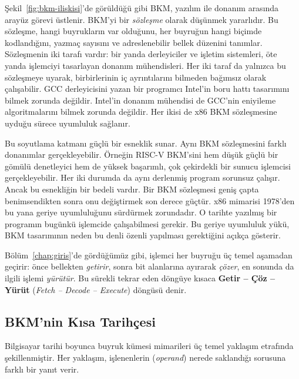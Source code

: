 Şekil~\ref{fig:bkm-iliskisi}'de görüldüğü gibi BKM, yazılım ile donanım arasında arayüz görevi üstlenir. BKM'yi bir \emph{sözleşme} olarak düşünmek yararlıdır. Bu sözleşme, hangi buyrukların var olduğunu, her buyruğun hangi biçimde kodlandığını, yazmaç sayısını ve adreslenebilir bellek düzenini tanımlar. Sözleşmenin iki tarafı vardır: bir yanda derleyiciler ve işletim sistemleri, öte yanda işlemciyi tasarlayan donanım mühendisleri. Her iki taraf da yalnızca bu sözleşmeye uyarak, birbirlerinin iç ayrıntılarını bilmeden bağımsız olarak çalışabilir. GCC derleyicisini yazan bir programcı Intel'in boru hattı tasarımını bilmek zorunda değildir. Intel'in donanım mühendisi de GCC'nin eniyileme algoritmalarını bilmek zorunda değildir. Her ikisi de x86 BKM sözleşmesine uyduğu sürece uyumluluk sağlanır.

Bu soyutlama katmanı güçlü bir esneklik sunar. Aynı BKM sözleşmesini farklı donanımlar gerçekleyebilir. Örneğin RISC-V BKM'sini hem düşük güçlü bir gömülü denetleyici hem de yüksek başarımlı, çok çekirdekli bir sunucu işlemcisi gerçekleyebilir. Her iki durumda da aynı derlenmiş program sorunsuz çalışır. Ancak bu esnekliğin bir bedeli vardır. Bir BKM sözleşmesi geniş çapta benimsendikten sonra onu değiştirmek son derece güçtür. x86 mimarisi 1978'den bu yana geriye uyumluluğunu sürdürmek zorundadır. O tarihte yazılmış bir programın bugünkü işlemcide çalışabilmesi gerekir. Bu geriye uyumluluk yükü, BKM tasarımının neden bu denli özenli yapılması gerektiğini açıkça gösterir.

Bölüm~\ref{chap:giris}'de gördüğümüz gibi, işlemci her buyruğu üç temel aşamadan geçirir: önce bellekten \emph{getirir}, sonra bit alanlarına ayırarak \emph{çözer}, en sonunda da ilgili işlemi \emph{yürütür}. Bu sürekli tekrar eden döngüye kısaca \textbf{Getir -- Çöz -- Yürüt} (\emph{Fetch -- Decode -- Execute}) döngüsü denir.


\subsection{BKM'nin Kısa Tarihçesi}
\label{subsec:bkm-tarihce}

Bilgisayar tarihi boyunca buyruk kümesi mimarileri üç temel yaklaşım etrafında şekillenmiştir. Her yaklaşım, işlenenlerin (\emph{operand}) nerede saklandığı sorusuna farklı bir yanıt verir.

